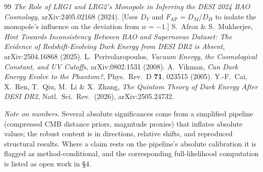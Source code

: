 \documentclass[11pt]{article}
\newcommand{\FAP}{\ensuremath{F_{\mathrm{AP}}}}
\begin{document}
\begin{thebibliography}{99}
 \emph{The Role of LRG1 and LRG2's Monopole in Inferring the DESI 2024 BAO Cosmology}, arXiv:2405.02168 (2024). [Uses $D_V$ and $\FAP=D_M/D_H$ to isolate the monopole's influence on the deviation from $w=-1$.]
 S.~Afroz \& S.~Mukherjee, \emph{Hint Towards Inconsistency Between BAO and Supernovae Dataset: The Evidence of Redshift-Evolving Dark Energy from DESI DR2 is Absent}, arXiv:2504.16868 (2025).
 L.~Perivolaropoulos, \emph{Vacuum Energy, the Cosmological Constant, and UV Cutoffs}, arXiv:0802.1531 (2008).
 A.~Vikman, \emph{Can Dark Energy Evolve to the Phantom?}, Phys.\ Rev.\ D \textbf{71}, 023515 (2005).
 Y.-F.~Cai, X.~Ren, T.~Qiu, M.~Li \& X.~Zhang, \emph{The Quintom Theory of Dark Energy After DESI DR2}, Natl.\ Sci.\ Rev.\ (2026), arXiv:2505.24732.
\end{thebibliography}

\vspace{0.5em}
\begin{caveatbox}
\textit{Note on numbers.} Several absolute significances come from a simplified pipeline (compressed CMB distance priors, magnitude proxies) that inflates absolute values; the robust content is in directions, relative shifts, and reproduced structural results. Where a claim rests on the pipeline's absolute calibration it is flagged as method-conditional, and the corresponding full-likelihood computation is listed as open work in \S4.
\end{caveatbox}
\end{document}
